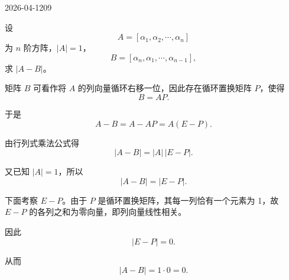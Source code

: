 \begin{mistake}{2026-04-12}{09}

\begin{problemcontent}
设
\[
A=[\alpha_1,\alpha_2,\cdots,\alpha_n]
\]
为 \(n\) 阶方阵，\(|A|=1\)，
\[
B=[\alpha_n,\alpha_1,\cdots,\alpha_{n-1}],
\]
求 \(|A-B|\)。

\end{problemcontent}

\begin{solutioncontent}
矩阵 \(B\) 可看作将 \(A\) 的列向量循环右移一位，因此存在循环置换矩阵 \(P\)，使得
\[
B=AP.
\]

于是
\[
A-B=A-AP=A(E-P).
\]

由行列式乘法公式得
\[
|A-B|=|A|\,|E-P|.
\]

又已知 \(|A|=1\)，所以
\[
|A-B|=|E-P|.
\]

下面考察 \(E-P\)。由于 \(P\) 是循环置换矩阵，其每一列恰有一个元素为 1，故 \(E-P\) 的各列之和为零向量，即列向量线性相关。

因此
\[
|E-P|=0.
\]

从而
\[
|A-B|=1\cdot 0=0.
\]

\end{solutioncontent}


\end{mistake}
